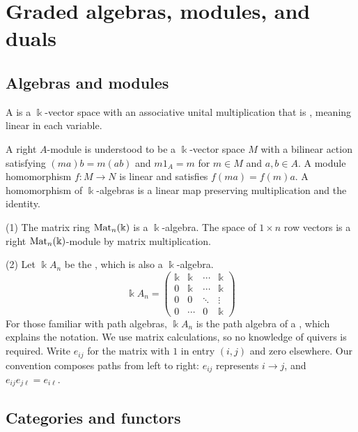 \section{Graded algebras, modules, and duals}

\subsection{Algebras and modules}

\begin{definition}
A  is a $\Bbbk$-vector space with an associative unital multiplication that is , meaning linear in each variable.
\end{definition}

A right $A$-module is understood to be a $\Bbbk$-vector space $M$ with a bilinear action satisfying $(ma)b=m(ab)$ and $m1_A=m$ for $m\in M$ and $a,b\in A$.
A module homomorphism $f:M\to N$ is linear and satisfies $f(ma)=f(m)a$.
A homomorphism of $\Bbbk$-algebras is a linear map preserving multiplication and the identity.

\begin{example}\label{ex:triangular-algebra}
(1) The matrix ring $\operatorname{Mat}\nolimits_n(\Bbbk)$ is a $\Bbbk$-algebra.
The space of $1\times n$ row vectors is a right $\operatorname{Mat}\nolimits_n(\Bbbk)$-module by matrix multiplication.

(2) Let $\Bbbk A_n$ be the , which is also a $\Bbbk$-algebra.
\[
\Bbbk A_n = \begin{pmatrix}
\Bbbk & \Bbbk & \cdots & \Bbbk \\
0 & \Bbbk & \cdots & \Bbbk \\
0 & 0 & \ddots & \vdots \\
0 & \cdots & 0 & \Bbbk
\end{pmatrix}
\]
For those familiar with path algebras, $\Bbbk A_n$ is the path algebra of a , which explains the notation. We use matrix calculations, so no knowledge of quivers is required.
Write $e_{ij}$ for the matrix with $1$ in entry $(i,j)$ and zero elsewhere.
Our convention composes paths from left to right: $e_{ij}$ represents $i\to j$, and $e_{ij}e_{j\ell}=e_{i\ell}$.
\end{example}

\subsection{Categories and functors}\label{subsec:category-language}

